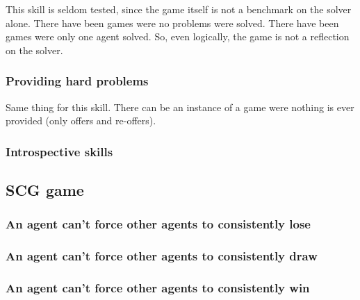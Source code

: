 \documentclass[letterpaper,12pt,oneside]{article}
\begin{document}
This skill is seldom tested, since the game itself is not a benchmark on
the solver alone. There have been games were no problems were solved. There
have been games were only one agent solved. So, even logically, the game is
not a reflection on the solver.

\subsubsection{Providing hard problems}

Same thing for this skill. There can be an instance of a game were nothing
is ever provided (only offers and re-offers).

\subsubsection{Introspective skills}


\subsection{SCG game}

\subsubsection{An agent can't force other agents to consistently lose}
\subsubsection{An agent can't force other agents to consistently draw}
\subsubsection{An agent can't force other agents to consistently win}

% 
% 
\end{document}
